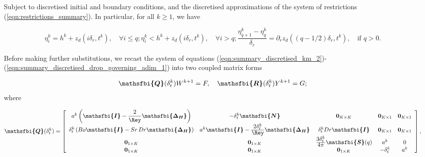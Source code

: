 \documentclass{jfm}
\newcommand{\bfjfm}[1]{\bm{\mathsfbi{#1}}}
\begin{document}
Subject to discretised initial and boundary conditions, and the discretised approximations of the system of restrictions (\ref{eqn:restrictions_summary}). In particular, for all $k\geq 1$, we have

\begin{subequations}
    \label{eqn:summary_discretised_restrictions}
    \begin{equation}
        \label{eqn:discrete_contact_condition}
        \eta^k_i = h^k + z_d(i  \delta_r, t^k), \quad \forall i \leq q;
    \end{equation}
    \begin{equation}
        \label{eqn:discrete_condition_no_overlay_drop}
        \eta^k_i< h^k + z_d(i \delta_r, t^k),  \quad \forall i > q;
    \end{equation}
    \begin{equation}
    \label{eqn:summary_km_tangent_condition}
    \frac{\eta^k_{q+1} - \eta^k_{q}}{\delta_r} = \partial_r z_d((q - 1/2) \delta_r, t^k),\quad  \text{if } q > 0.
    \end{equation}
    
\end{subequations}

Before making further substitutions, we recast the system of equations (\ref{eqn:summary_discretised_km_2})-(\ref{eqn:summary_discretised_drop_governing_adim_1}) into two coupled matrix forms

\begin{equation}
\label{eqn:matrix_form_uncoupled}
    \bfjfm{Q}(\delta_t^k) W^{k+1} = F, \quad \bfjfm{R}(\delta^k_t) Y^{k+1} = G;
\end{equation}
where
\renewcommand{\arraystretch}{1.8}

\setlength{\arraycolsep}{4pt}
 \begin{equation}
     \label{eqn:bath_matrix_form_1}
     \bfjfm{Q}(\delta_t^k)
     =
     \left[
    \begin{array}{ccccc}
        a^k\left(\bfjfm{I}- \dfrac{ 2}{\Rey} \bfjfm{\Delta_H}\right) 
        & -\delta_t^{k}\bfjfm{N}
        & \mathbf{0}_{K\times K}
        & \mathbf{0}_{K\times 1}
        & \mathbf{0}_{K\times 1}
        \\
        \delta_t^{k} \left( \displaystyle Bo \bfjfm{I} - \textstyle Sr\, \textstyle Dr \bfjfm{\Delta_H}\right)
        & a^k \bfjfm{I} - \frac{ \textstyle 2 \delta^k_t}{ \textstyle \Rey} \bfjfm{\Delta_H}
        & \delta_t^{k}Dr \bfjfm{I}
        & \mathbf{0}_{K\times 1}
        & \mathbf{0}_{K\times 1}
        \\
        \mathbf{0}_{1\times K}
        & \mathbf{0}_{1\times K}
        & \frac{\textstyle 3\delta^k_t}{\textstyle 4\pi} \bfjfm{S}(q)
        & a^k
        & 0
        \\
        \mathbf{0}_{1\times K}
        & \mathbf{0}_{1\times K}
        & \mathbf{0}_{1\times K}
        & -\delta^k_t
        & a^k
    \end{array}
    \right],
 \end{equation}
\end{document}
